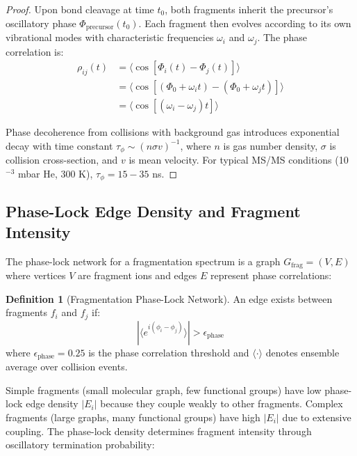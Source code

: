 \documentclass[twocolumn,10pt,a4paper]{article}
\theoremstyle{definition}
\newtheorem{definition}[theorem]{Definition}
\theoremstyle{remark}
\begin{document}
\begin{proof}
Upon bond cleavage at time $t_0$, both fragments inherit the precursor's oscillatory phase $\Phi_{\text{precursor}}(t_0)$. Each fragment then evolves according to its own vibrational modes with characteristic frequencies $\omega_i$ and $\omega_j$. The phase correlation is:
\begin{align}
\rho_{ij}(t) &= \langle \cos[\Phi_i(t) - \Phi_j(t)] \rangle \\
&= \langle \cos[(\Phi_0 + \omega_i t) - (\Phi_0 + \omega_j t)] \rangle \\
&= \langle \cos[(\omega_i - \omega_j) t] \rangle
\end{align}

Phase decoherence from collisions with background gas introduces exponential decay with time constant $\tau_{\phi} \sim (n \sigma v)^{-1}$, where $n$ is gas number density, $\sigma$ is collision cross-section, and $v$ is mean velocity. For typical MS/MS conditions (10$^{-3}$ mbar He, 300 K), $\tau_{\phi} = 15-35$ ns.
\end{proof}

\subsection{Phase-Lock Edge Density and Fragment Intensity}

The phase-lock network for a fragmentation spectrum is a graph $G_{\text{frag}} = (V, E)$ where vertices $V$ are fragment ions and edges $E$ represent phase correlations:

\begin{definition}[Fragmentation Phase-Lock Network]
\label{def:frag_network}
An edge exists between fragments $f_i$ and $f_j$ if:
\begin{equation}
|\langle e^{i(\phi_i - \phi_j)}\rangle| > \epsilon_{\text{phase}}
\end{equation}
where $\epsilon_{\text{phase}} = 0.25$ is the phase correlation threshold and $\langle \cdot \rangle$ denotes ensemble average over collision events.
\end{definition}

Simple fragments (small molecular graph, few functional groups) have low phase-lock edge density $|E_i|$ because they couple weakly to other fragments. Complex fragments (large graphs, many functional groups) have high $|E_i|$ due to extensive coupling. The phase-lock density determines fragment intensity through oscillatory termination probability:
\end{document}
